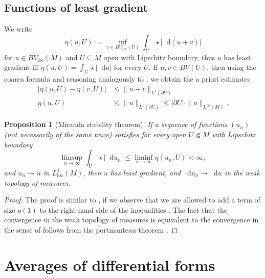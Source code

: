 \documentclass[final,12pt, leqno]{brownthesis}
\newcommand*\dif{\mathop{}\!\mathrm{d}}
\newcommand{\loc}{\mathrm{loc}}
\newcommand{\cpt}{\mathrm{cpt}}
\newtheorem{proposition}[theorem]{Proposition}
\theoremstyle{definition}
\numberwithin{equation}{section}
\begin{document}
\subsection{Functions of least gradient}
We write
$$\eta(u, U) := \inf_{v \in BV_\cpt(U)} \int_U \star |\dif(u + v)|$$
for $u \in BV_\loc(M)$ and $U \subseteq M$ open with Lipschitz boundary, thus $u$ has least gradient iff $\eta(u, U) = \int_U \star |\dif u|$ for every $U$.
If $u, v \in BV(U)$, then using the coarea formula and reasoning analogously to \cite[Lemma 5.6]{Giusti77}, we obtain the a priori estimates
\begin{align}
|\eta(u, U) - \eta(v, U)| &\leq \|u - v\|_{L^1(\partial U)} \label{a priori estimate 1} \\
\eta(u, U) &\leq \|u\|_{L^1(\partial U)} \leq |\partial U| \cdot \|u\|_{L^\infty(M)}. \label{a priori estimate 2}
\end{align}

\begin{proposition}[Miranda stability theorem]\label{Miranda convergence}
If a sequence of functions $(u_n)$ (not necessarily of the same trace) satisfies for every open $U \Subset M$ with Lipschitz boundary
$$\limsup_{n \to \infty} \int_U \star |\dif u_n| \leq \liminf_{n \to \infty} \eta(u_n, U) < \infty,$$
and $u_n \to u$ in $L^1_\loc(M)$, then $u$ has least gradient, and $\dif u_n \to \dif u$ in the weak topology of measures.
\end{proposition}
\begin{proof}
The proof is similar to \cite[Teorema 3 and Osservazione 3]{Miranda67}, if we observe that we are allowed to add a term of size $o(1)$ to the right-hand side of the inequalities \cite[(2.8), (2.9), (2.13), and (2.14)]{Miranda67}.
The fact that the convergence in the weak topology of measures is equivalent to the convergence in the sense of \cite[Osservazione 3]{Miranda67} follows from the portmanteau theorem \cite[Theorem 13.16]{klenke2013probability}.
\end{proof}

\section{Averages of differential forms}\label{excess section}
\end{document}
